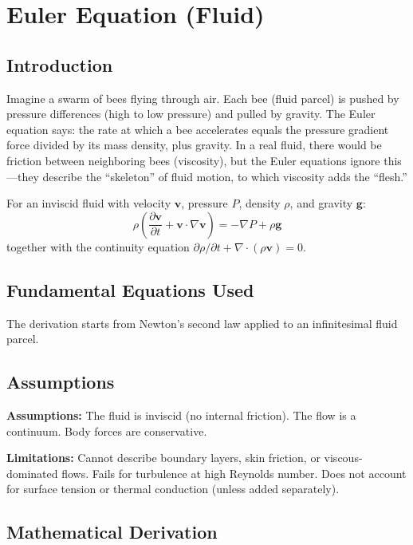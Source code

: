 \chapter{Euler Equation (Fluid)}

\section*{Introduction}

Imagine a swarm of bees flying through air. Each bee (fluid parcel) is pushed by pressure differences (high to low pressure) and pulled by gravity. The Euler equation says: the rate at which a bee accelerates equals the pressure gradient force divided by its mass density, plus gravity. In a real fluid, there would be friction between neighboring bees (viscosity), but the Euler equations ignore this---they describe the ``skeleton'' of fluid motion, to which viscosity adds the ``flesh.''


For an inviscid fluid with velocity $\mathbf{v}$, pressure $P$, density $\rho$, and gravity $\mathbf{g}$:
\[
\rho\left(\frac{\partial \mathbf{v}}{\partial t} + \mathbf{v} \cdot \nabla \mathbf{v}\right) = -\nabla P + \rho \mathbf{g}
\]
together with the continuity equation $\partial \rho / \partial t + \nabla \cdot (\rho \mathbf{v}) = 0$.

\section*{Fundamental Equations Used}

The derivation starts from Newton's second law applied to an infinitesimal fluid parcel.

\section*{Assumptions}

\textbf{Assumptions:} The fluid is inviscid (no internal friction). The flow is a continuum. Body forces are conservative.


\textbf{Limitations:} Cannot describe boundary layers, skin friction, or viscous-dominated flows. Fails for turbulence at high Reynolds number. Does not account for surface tension or thermal conduction (unless added separately).


\section*{Mathematical Derivation}

